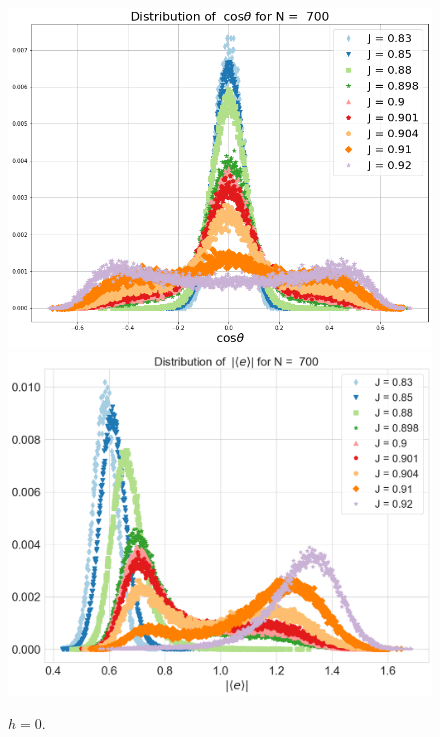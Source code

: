   \begin{figure}[H]
	\centering
	\includegraphics[scale=0.25]{Images/distr_cos_700.png}
	\includegraphics[scale=0.25]{Images/distr_energy_700.png}
	\caption{$h=0$.  }
	\label{fig:distributions_3D}
\end{figure}